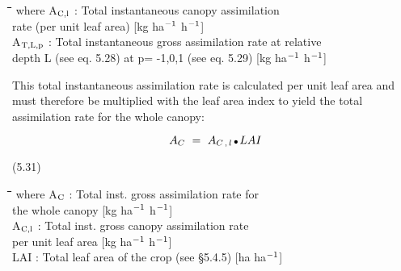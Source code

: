 \nwln
\begin{tabbing}
\hspace{1.27cm}\=\hspace{1.27cm}\=\hspace{1.27cm}\=\hspace{1.27cm}\=%
\hspace{1.27cm}\=\hspace{1.27cm}\=\hspace{1.27cm}\=\hspace{1.27cm}\=%
\hspace{1.27cm}\=\hspace{1.27cm}\=\kill
where A$_{{\rm C,l}}$ : Total instantaneous canopy assimi\-la\-tion \\
   rate (per unit leaf area)        [kg ha$^{{\rm -1}}$ h$^{{\rm -1}}$]\\
A$_{{\rm T,L,p}}$ : Total instantaneous gross assimilation rate at relative \\
   depth L (see eq. 5.28) at p= -1,0,1 (see eq. 5.29)        [kg ha$^{{\rm -1}}$ h$^{{\rm -1}}$]
\end{tabbing}



This total instantaneous assimilation rate is calculated per unit leaf area and must
therefore be multiplied with the leaf area index to yield the total assimilation rate for the
whole canopy:

\begin{displaymath}
A _{C} ~=~ A _{C\, ,\, l} \, {\rm \Bullet{0.75ex}}\, LAI
\end{displaymath}

 
\strut\hfill (5.31)
\nwln
\begin{tabbing}
\hspace{1.27cm}\=\hspace{1.27cm}\=\hspace{1.27cm}\=\hspace{1.27cm}\=%
\hspace{1.27cm}\=\hspace{1.27cm}\=\hspace{1.27cm}\=\hspace{1.27cm}\=%
\hspace{1.27cm}\=\hspace{1.27cm}\=\kill
where A$_{{\rm C}}$ : Total inst. gross assimila\-tion rate for\\
   the whole canopy        [kg ha$^{{\rm -1}}$ h$^{{\rm -1}}$]\\
A$_{{\rm C,l}}$ : Total inst. gross canopy assimila\-tion rate\\
   per unit leaf area        [kg ha$^{{\rm -1}}$ h$^{{\rm -1}}$]\\
LAI : Total leaf area of the crop (see \S 5.4.5)        [ha ha$^{{\rm -1}}$]
\end{tabbing}



